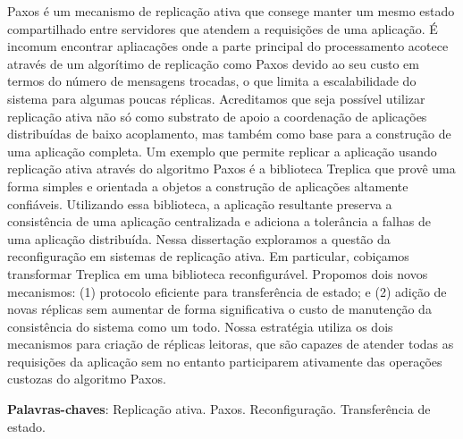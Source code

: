\setlength{\absparsep}{18pt} %

\begin{resumo}
Paxos é um mecanismo de replicação ativa que consege manter um mesmo estado compartilhado
entre servidores que atendem a requisições de uma aplicação. É incomum encontrar
apliacações onde a parte principal do processamento acotece através de um algorítimo de
replicação como Paxos devido ao seu custo em termos do número de mensagens trocadas, o que
limita a escalabilidade do sistema para algumas poucas réplicas. Acreditamos que seja
possível utilizar replicação ativa não só como substrato de apoio a coordenação de
aplicações distribuídas de baixo acoplamento, mas também como base para a construção de
uma aplicação completa. Um exemplo que permite replicar a aplicação usando replicação
ativa através do algoritmo Paxos é a biblioteca Treplica que provê uma forma simples e
orientada a objetos a construção de aplicações altamente confiáveis. Utilizando essa
biblioteca, a aplicação resultante preserva a consistência de uma aplicação centralizada e
adiciona a tolerância a falhas de uma aplicação distribuída. Nessa dissertação exploramos
a questão da reconfiguração em sistemas de replicação ativa. Em particular, cobiçamos
transformar Treplica em uma biblioteca reconfigurável. Propomos dois novos mecanismos:
(1) protocolo eficiente para transferência de estado; e (2) adição de novas réplicas sem
aumentar de forma significativa o custo de manutenção da consistência do sistema como um
todo. Nossa estratégia utiliza os dois mecanismos para criação de réplicas leitoras, que
são capazes de atender todas as requisições da aplicação sem no entanto participarem
ativamente das operações custozas do algoritmo Paxos.

\textbf{Palavras-chaves}: Replicação ativa. Paxos. Reconfiguração. Transferência de
estado.

\end{resumo}


